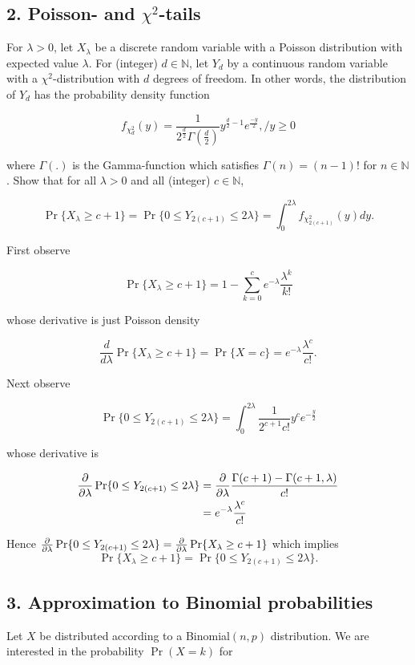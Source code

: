 \documentclass{tufte-book}
\begin{document}
\subsection{2. Poisson- and $\chi^2$-tails}
For $\lambda > 0$, let $X_{\lambda}$ be a discrete random variable with a Poisson distribution with expected value $\lambda$.  For (integer) $d \in \mathbb{N}$, let $Y_d$ by a continuous random variable with a $\chi^2$-distribution with $d$ degrees of freedom.  In other words, the distribution of $Y_d$ has the probability density function

\[ f_{\chi^2_d}(y) = \frac{1}{2^{\frac{d}{2}}\Gamma(\frac{d}{2})}y^{\frac{d}{2}-1} e^{\frac{-y}{2}}, / y \geq 0 \]

where $\Gamma(.)$ is the Gamma-function which satisfies $\Gamma(n) = (n-1)!$ for $n \in \mathbb{N}$.  Show that for all $\lambda > 0$ and all (integer) $c \in \mathbb{N}$,

\[ \Pr\{X_{\lambda} \geq c+1\} = \Pr\{0 \leq Y_{2(c+1)} \leq 2\lambda\} = \int_0^{2\lambda}f_{\chi^2_{2(c+1)}}(y) dy. \]

First observe

\[ \Pr\{X_{\lambda} \geq c+1\} = 1-\sum_{k=0}^c e^{-\lambda}\frac{\lambda^k}{k!} \]

whose derivative is just Poisson density

\[ \frac{d}{d\lambda}\Pr\{X_{\lambda} \geq c+1\}= \Pr\{X=c\} = e^{-\lambda} \frac{\lambda^c}{c!}. \]

Next observe

\[ \Pr\{0 \leq Y_{2(c+1)} \leq 2\lambda\} = \int_0^{2\lambda} \frac{1}{2^{c+1} c!}y^c e^{-\frac{y}{2}} \]

whose derivative is

\begin{align*}
\frac{\partial }{\partial \lambda} \Pr\{0 \leq Y_{2(c+1)} \leq 2\lambda\} &= \frac{\partial }{\partial \lambda} \frac{\Gamma(c+1) - \Gamma(c+1, \lambda)}{c!} \\
&= e^{-\lambda} \frac{\lambda^c}{c!} \\
\end{align*}

Hence $\frac{\partial }{\partial \lambda} \Pr\{0 \leq Y_{2(c+1)} \leq 2\lambda\} = \frac{\partial }{\partial \lambda}\Pr\{X_{\lambda} \geq c+1\}$ which implies
\[ \Pr\{X_{\lambda} \geq c+1\} = \Pr\{0 \leq Y_{2(c+1)} \leq 2\lambda\}. \]

\subsection{3. Approximation to Binomial probabilities}
Let $X$ be distributed according to a Binomial$(n,p)$ distribution.  We are interested in the probability $\Pr(X=k)$ for
\end{document}
